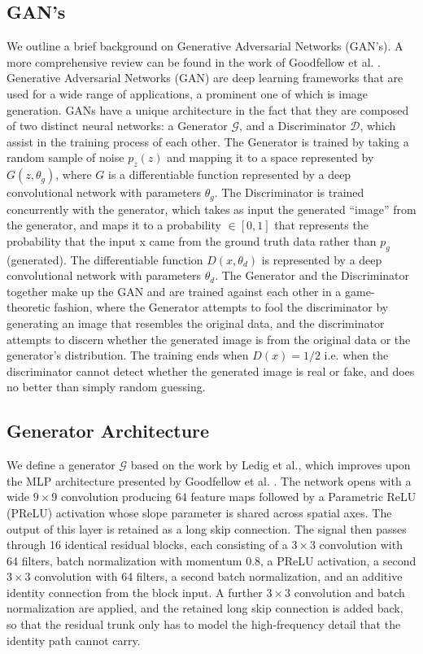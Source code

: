 \documentclass[conference]{IEEEtran}
\begin{document}
\subsection{GAN's}
We outline a brief background on Generative Adversarial Networks (GAN's). A more comprehensive review can be found in the work of Goodfellow et al. \cite{goodfellow2020generative}. 
Generative Adversarial Networks (GAN) are deep learning frameworks that are used for a wide range of applications, a prominent one of which is image generation. GANs have a unique architecture in the fact that they are composed of two distinct neural networks: a Generator $ \mathcal{G}$, and a Discriminator $\mathcal{D}$, which assist in the training process of each other. The Generator is trained by taking a random sample of noise $p_z(z)$ and mapping it to a space represented by $G(z, \theta_g)$, where $G$ is a differentiable function represented by a deep convolutional network with parameters $\theta_g$. The Discriminator is trained concurrently with the generator, which takes as input the generated “image” from the generator, and maps it to a probability $\in [0,1]$ that represents the probability that the input x came from the ground truth data rather than $p_g$ (generated). The differentiable function $D(x, \theta_d)$ is represented by a deep convolutional network with parameters $\theta_d$. The Generator and the Discriminator together make up the GAN and are trained against each other in a game-theoretic fashion, where the Generator attempts to fool the discriminator by generating an image that resembles the original data, and the discriminator attempts to discern whether the generated image is from the original data or the generator’s distribution. The training ends when $D(x) = 1/2$ i.e. when the discriminator cannot detect whether the generated image is real or fake, and does no better than simply random guessing.

\subsection{Generator Architecture}

We define a generator $\mathcal{G}$ based on the work by Ledig et al.\cite{ledig2017photo}, which improves upon the MLP architecture presented by Goodfellow et al. \cite{goodfellow2020generative}. The network opens with a wide $9 \times 9$ convolution producing 64 feature maps followed by a Parametric ReLU (PReLU) activation whose slope parameter is shared across spatial axes. The output of this layer is retained as a long skip connection. The signal then passes through 16 identical residual blocks, each consisting of a $3 \times 3$ convolution with 64 filters, batch normalization with momentum $0.8$, a PReLU activation, a second $3 \times 3$ convolution with 64 filters, a second batch normalization, and an additive identity connection from the block input. A further $3 \times 3$ convolution and batch normalization are applied, and the retained long skip connection is added back, so that the residual trunk only has to model the high-frequency detail that the identity path cannot carry.
\end{document}
